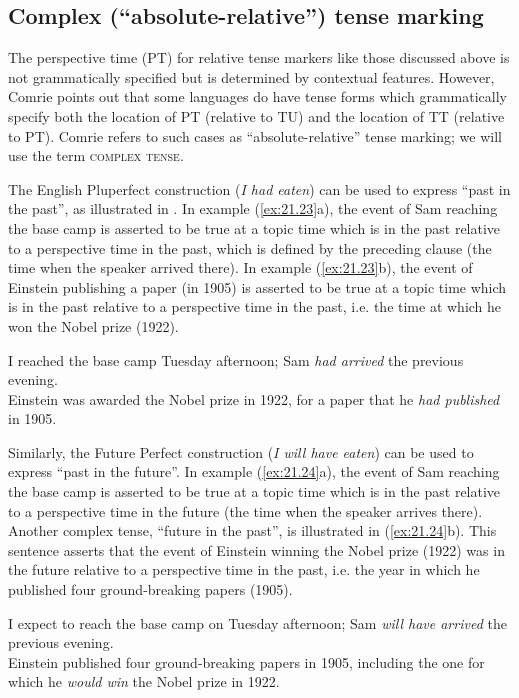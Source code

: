 \subsection{Complex (“absolute-relative”) tense marking}\label{sec:21.4.1}

The perspective time (PT) for relative tense markers like those discussed above is not grammatically specified but is determined by contextual features. However, Comrie points out that some languages do have tense forms which grammatically specify both the location of PT (relative to TU) and the location of TT (relative to PT). Comrie refers to such cases as “absolute-relative” tense marking; we will use the term \textsc{complex tense}.



The English Pluperfect construction (\textit{I had eaten}) can be used to express “past in the past”, as illustrated in . In example (\ref{ex:21.23}a), the event of Sam reaching the base camp is asserted to be true at a topic time which is in the past relative to a perspective time in the past, which is defined by the preceding clause (the time when the speaker arrived there). In example (\ref{ex:21.23}b), the event of Einstein publishing a paper (in 1905) is asserted to be true at a topic time which is in the past relative to a perspective time in the past, i.e. the time at which he won the Nobel prize (1922).


\ea \label{ex:21.23}
\ea  I reached the base camp Tuesday afternoon; Sam \textit{had arrived} the previous evening.\\
\ex Einstein was awarded the Nobel prize in 1922, for a paper that he \textit{had published} in 1905.
                       \z
\z


Similarly, the Future Perfect construction (\textit{I will have eaten}) can be used to express “past in the future”. In example (\ref{ex:21.24}a), the event of Sam reaching the base camp is asserted to be true at a topic time which is in the past relative to a perspective time in the future (the time when the speaker arrives there). Another complex tense, “future in the past”, is illustrated in (\ref{ex:21.24}b). This sentence asserts that the event of Einstein winning the Nobel prize (1922) was in the future relative to a perspective time in the past, i.e. the year in which he published four ground-breaking papers (1905).


\ea \label{ex:21.24}
\ea  I expect to reach the base camp on Tuesday afternoon; Sam \textit{will have arrived} the previous evening.\\
\ex Einstein published four ground-breaking papers in 1905, including the one for which he \textit{would win} the Nobel prize in 1922.
                       \z
\z


